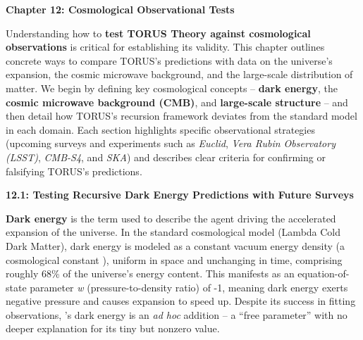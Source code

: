 \documentclass[]{article}
\begin{document}
\textbf{Chapter 12: Cosmological Observational Tests}

Understanding how to \textbf{test TORUS Theory against cosmological
observations} is critical for establishing its validity. This chapter
outlines concrete ways to compare TORUS's predictions with data on the
universe's expansion, the cosmic microwave background, and the
large-scale distribution of matter. We begin by defining key
cosmological concepts -- \textbf{dark energy}, the \textbf{cosmic
microwave background (CMB)}, and \textbf{large-scale structure} -- and
then detail how TORUS's recursion framework deviates from the standard
\LambdaCDM model in each domain. Each section highlights specific
observational strategies (upcoming surveys and experiments such as
\emph{Euclid}, \emph{Vera Rubin Observatory (LSST)}, \emph{CMB-S4}, and
\emph{SKA}) and describes clear criteria for confirming or falsifying
TORUS's predictions.

\textbf{12.1: Testing Recursive Dark Energy Predictions with Future
Surveys}

\textbf{Dark energy} is the term used to describe the agent driving the
accelerated expansion of the universe. In the standard \textbf{\LambdaCDM}
cosmological model (Lambda Cold Dark Matter), dark energy is modeled as
a constant vacuum energy density (a cosmological constant \textbf{\Lambda}),
uniform in space and unchanging in time, comprising roughly 68\% of the
universe's energy content. This manifests as an equation-of-state
parameter \emph{w} (pressure-to-density ratio) of -1, meaning dark
energy exerts negative pressure and causes expansion to speed up.
Despite its success in fitting observations, \LambdaCDM's dark energy is an
\emph{ad hoc} addition -- a ``free parameter'' with no deeper
explanation for its tiny but nonzero value.
\end{document}
